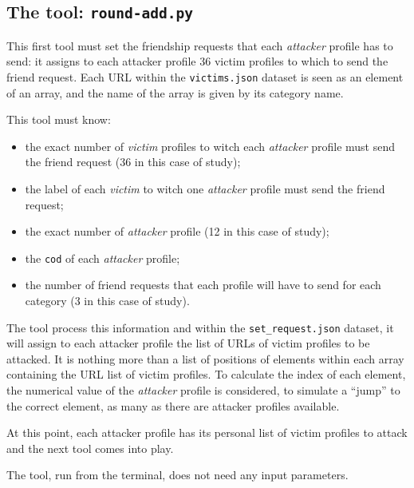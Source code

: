 \subsection{The tool: \texttt{round-add.py}}
This first tool must set the friendship requests that each \textit{attacker} profile has to send: it assigns to each attacker profile $36$ victim profiles to which to send the friend request. 
Each URL within the \texttt{victims.json} dataset is seen as an element of an array, and the name of the array is given by its category name.
\par \noindent  This tool must know:
\begin{itemize}
	\item the exact number of \textit{victim} profiles to witch each \textit{attacker} profile must send the friend request (36 in this case of study);
	\item the label of each \textit{victim} to witch one \textit{attacker} profile must send the friend request;
	\item the exact number of \textit{attacker} profile (12 in this case of study);
	\item the \texttt{cod} of each \textit{attacker} profile;
	\item the number of friend requests that each profile will have to send for each category (3 in this case of study).
\end{itemize}
The tool process this information and within the \texttt{set\_request.json} dataset, it will assign to each attacker profile the list of URLs of victim profiles to be attacked. It is nothing more than a list of positions of elements within each array containing the URL list of victim profiles. To calculate the index of each element, the numerical value of the \textit{attacker} profile is considered, to simulate a ``jump'' to the correct element, as many as there are attacker profiles available.\par \noindent 
At this point, each attacker profile has its personal list of victim profiles to attack and the next tool comes into play.
\par \noindent The tool, run from the terminal, does not need any input parameters.

